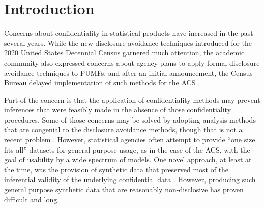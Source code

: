 \documentclass[inline]{hdsr}
\begin{document}
\section*{Introduction}
\label{intro}



Concerns about confidentiality in statistical products have increased in the past several years. While the new disclosure avoidance techniques introduced for the 2020 United States Decennial Census \citep{abowd_2020_2022} garnered much attention, the academic community also expressed concerns about agency plans to apply formal disclosure avoidance techniques to \acp{PUMF}, and after an initial announcement, the Census Bureau delayed implementation of such methods for the \ac{ACS} \citep{daily_disclosure_2022}. 

Part of the concern is that the application of confidentiality methods may prevent inferences that were feasibly made in the absence of those confidentiality procedures. Some of those concerns may be solved by adopting analysis methods that are congenial \citep{meng_multiple-imputation_1994} to the disclosure avoidance methods, though that is not a recent problem \citep{AbowdSchmutte_BPEA2015}. However, statistical agencies often attempt to provide ``one size fits all'' datasets for general purpose usage, as in the case of the \ac{ACS}, with the goal of  usability by a wide spectrum of models. One novel approach, at least at the time, was the provision of synthetic data that preserved most of the inferential validity of the underlying confidential data \citep{rubin_discussion_1993,little_statistical_1993,reiter_synthetic_2023,raghunathan_synthetic_2021}. However, producing such general purpose synthetic data that are reasonably non-disclosive has proven difficult and long.
\end{document}

